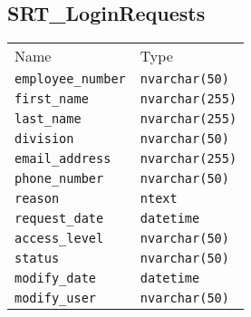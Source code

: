 \subsection{SRT\_LoginRequests}
\begin{table}[h]
\centering
\begin{tabular}{ll}
Name    & Type  \\
\verb|employee_number|  &   \verb|nvarchar(50)|     \\
\verb|first_name|       &   \verb|nvarchar(255)|    \\
\verb|last_name|        &   \verb|nvarchar(255)|    \\
\verb|division|         &   \verb|nvarchar(50)|     \\
\verb|email_address|    &   \verb|nvarchar(255)|    \\
\verb|phone_number|     &   \verb|nvarchar(50)|     \\
\verb|reason|           &   \verb|ntext|            \\
\verb|request_date|     &   \verb|datetime|         \\
\verb|access_level|     &   \verb|nvarchar(50)|     \\
\verb|status|           &   \verb|nvarchar(50)|     \\
\verb|modify_date|      &   \verb|datetime|         \\
\verb|modify_user|      &   \verb|nvarchar(50)|
\end{tabular}
\end{table}
